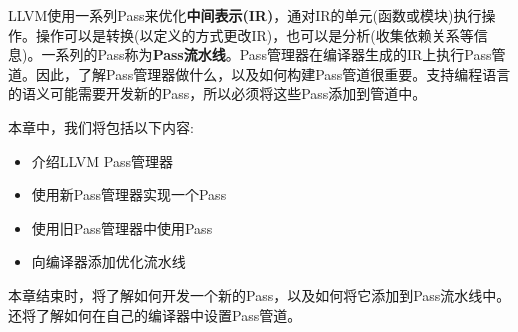 LLVM使用一系列Pass来优化\textbf{中间表示(IR)}，通对IR的单元(函数或模块)执行操作。操作可以是转换(以定义的方式更改IR)，也可以是分析(收集依赖关系等信息)。一系列的Pass称为\textbf{Pass流水线}。Pass管理器在编译器生成的IR上执行Pass管道。因此，了解Pass管理器做什么，以及如何构建Pass管道很重要。支持编程语言的语义可能需要开发新的Pass，所以必须将这些Pass添加到管道中。\par

本章中，我们将包括以下内容:\par

\begin{itemize}
\item 介绍LLVM Pass管理器
\item 使用新Pass管理器实现一个Pass
\item 使用旧Pass管理器中使用Pass
\item 向编译器添加优化流水线
\end{itemize}

本章结束时，将了解如何开发一个新的Pass，以及如何将它添加到Pass流水线中。还将了解如何在自己的编译器中设置Pass管道。\par














